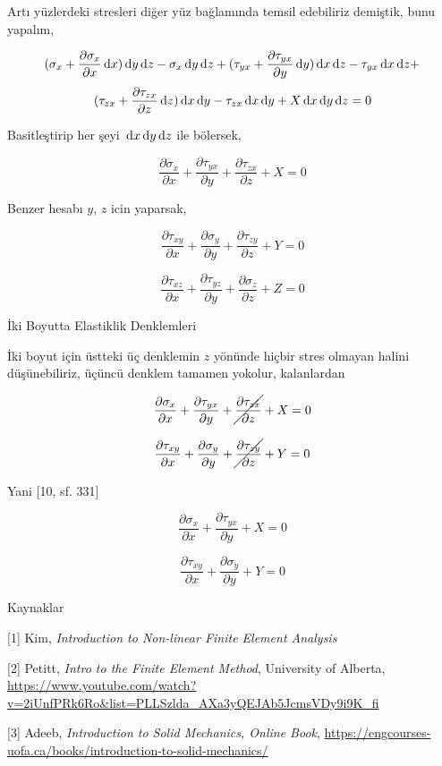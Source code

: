 \documentclass[12pt,fleqn]{article}\usepackage{../../common}
\begin{document}
Artı yüzlerdeki stresleri diğer yüz bağlamında temsil edebiliriz demiştik, bunu
yapalım,

$$
(\sigma_x  + \dfrac{\partial \sigma_x}{\partial x} \,\mathrm{d} x )\,\mathrm{d} y \,\mathrm{d} z - \sigma_x \,\mathrm{d} y \,\mathrm{d} z +
(\tau_{yx}  + \dfrac{\partial \tau_{yx}}{\partial y} \,\mathrm{d} y ) \,\mathrm{d} x \,\mathrm{d} z -
\tau_{yx} \,\mathrm{d} x \,\mathrm{d} z +
$$
$$
(\tau_{zx}  + \dfrac{\partial \tau_{zx}}{\partial z} \,\mathrm{d} z ) \,\mathrm{d} x \,\mathrm{d} y - \tau_{zx} \,\mathrm{d} x \,\mathrm{d} y +
X \,\mathrm{d} x \,\mathrm{d} y \,\mathrm{d} z = 0
$$

Basitleştirip her şeyi $\,\mathrm{d} x \,\mathrm{d} y \,\mathrm{d} z$ ile bölersek,

$$
\frac{\partial \sigma_x}{\partial x} + 
\frac{\partial \tau_{yx}}{\partial y} + 
\frac{\partial \tau_{zx}}{\partial z} + X = 0
$$

Benzer hesabı $y$, $z$ icin yaparsak,

$$
\frac{\partial \tau_{xy}}{\partial x} + 
\frac{\partial \sigma_y}{\partial y} + 
\frac{\partial \tau_{zy}}{\partial z} + Y = 0
$$

$$
\frac{\partial \tau_{xz}}{\partial x} + 
\frac{\partial \tau_{yz}}{\partial y} + 
\frac{\partial \sigma_z}{\partial z} + Z = 0
$$

İki Boyutta Elastiklik Denklemleri

İki boyut için üstteki üç denklemin $z$ yönünde hiçbir stres olmayan halini
düşünebiliriz, üçüncü denklem tamamen yokolur, kalanlardan

$$
\frac{\partial \sigma_x}{\partial x} + 
\frac{\partial \tau_{yx}}{\partial y} + 
\cancel{\frac{\partial \tau_{zx}}{\partial z}} + X = 0
$$

$$
\frac{\partial \tau_{xy}}{\partial x} + 
\frac{\partial \sigma_y}{\partial y} + 
\cancel{\frac{\partial \tau_{zy}}{\partial z}} + Y = 0
$$

Yani [10, sf. 331]

$$
\frac{\partial \sigma_x}{\partial x} + 
\frac{\partial \tau_{yx}}{\partial y} + X = 0
$$

$$
\frac{\partial \tau_{xy}}{\partial x} + 
\frac{\partial \sigma_y}{\partial y} + Y = 0
$$


Kaynaklar

[1] Kim, {\em Introduction to Non-linear Finite Element Analysis}

[2] Petitt, {\em Intro to the Finite Element Method}, University of Alberta,
    \url{https://www.youtube.com/watch?v=2iUnfPRk6Ro&list=PLLSzlda_AXa3yQEJAb5JcmsVDy9i9K_fi}
    
[3] Adeeb, {\em Introduction to Solid Mechanics, Online Book},
    \url{https://engcourses-uofa.ca/books/introduction-to-solid-mechanics/}
\end{document}
